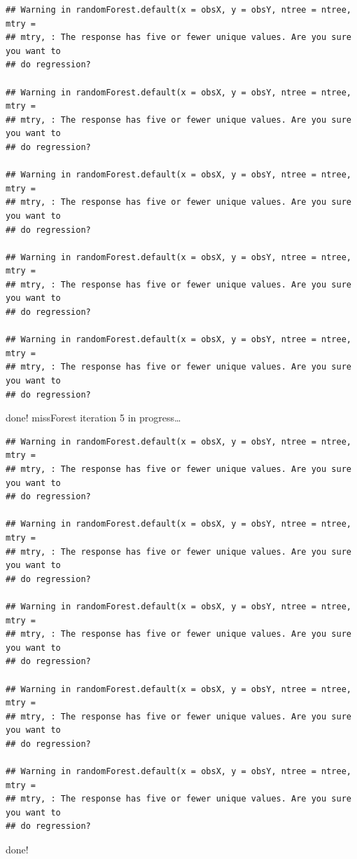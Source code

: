 \documentclass[
]{article}
\begin{document}
\begin{verbatim}
## Warning in randomForest.default(x = obsX, y = obsY, ntree = ntree, mtry =
## mtry, : The response has five or fewer unique values. Are you sure you want to
## do regression?

## Warning in randomForest.default(x = obsX, y = obsY, ntree = ntree, mtry =
## mtry, : The response has five or fewer unique values. Are you sure you want to
## do regression?

## Warning in randomForest.default(x = obsX, y = obsY, ntree = ntree, mtry =
## mtry, : The response has five or fewer unique values. Are you sure you want to
## do regression?

## Warning in randomForest.default(x = obsX, y = obsY, ntree = ntree, mtry =
## mtry, : The response has five or fewer unique values. Are you sure you want to
## do regression?

## Warning in randomForest.default(x = obsX, y = obsY, ntree = ntree, mtry =
## mtry, : The response has five or fewer unique values. Are you sure you want to
## do regression?
\end{verbatim}

done! missForest iteration 5 in progress\ldots{}

\begin{verbatim}
## Warning in randomForest.default(x = obsX, y = obsY, ntree = ntree, mtry =
## mtry, : The response has five or fewer unique values. Are you sure you want to
## do regression?

## Warning in randomForest.default(x = obsX, y = obsY, ntree = ntree, mtry =
## mtry, : The response has five or fewer unique values. Are you sure you want to
## do regression?

## Warning in randomForest.default(x = obsX, y = obsY, ntree = ntree, mtry =
## mtry, : The response has five or fewer unique values. Are you sure you want to
## do regression?

## Warning in randomForest.default(x = obsX, y = obsY, ntree = ntree, mtry =
## mtry, : The response has five or fewer unique values. Are you sure you want to
## do regression?

## Warning in randomForest.default(x = obsX, y = obsY, ntree = ntree, mtry =
## mtry, : The response has five or fewer unique values. Are you sure you want to
## do regression?
\end{verbatim}

done!
\end{document}
